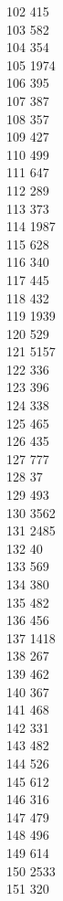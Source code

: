 { 102	415 \\
 103	582 \\
 104	354 \\
 105	1974 \\
 106	395 \\
 107	387 \\
 108	357 \\
 109	427 \\
 110	499 \\
 111	647 \\
 112	289 \\
 113	373 \\
 114	1987 \\
 115	628 \\
 116	340 \\
 117	445 \\
 118	432 \\
 119	1939 \\
 120	529 \\
 121	5157 \\
 122	336 \\
 123	396 \\
 124	338 \\
 125	465 \\
 126	435 \\
 127	777 \\
 128	37 \\
 129	493 \\
 130	3562 \\
 131	2485 \\
 132	40 \\
 133	569 \\
 134	380 \\
 135	482 \\
 136	456 \\
 137	1418 \\
 138	267 \\
 139	462 \\
 140	367 \\
 141	468 \\
 142	331 \\
 143	482 \\
 144	526 \\
 145	612 \\
 146	316 \\
 147	479 \\
 148	496 \\
 149	614 \\
 150	2533 \\
 151	320 \\
}
